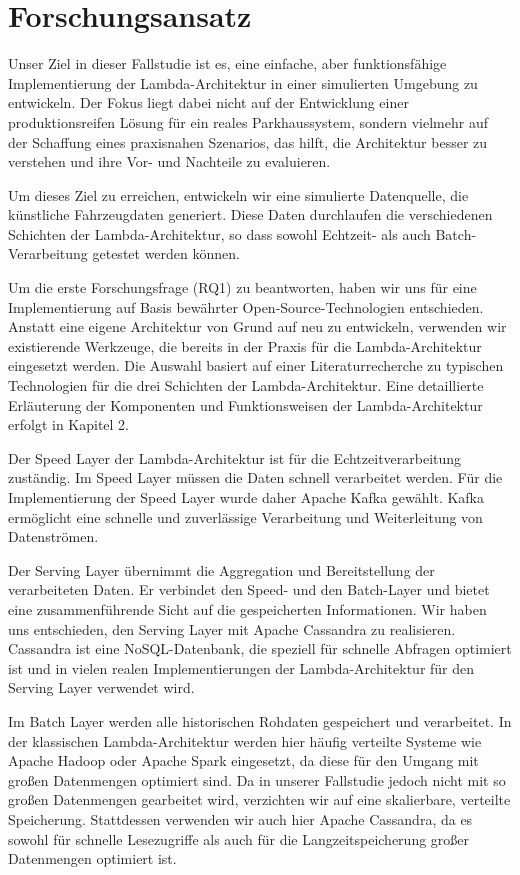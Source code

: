 \section{Forschungsansatz}
Unser Ziel in dieser Fallstudie ist es, eine einfache, aber funktionsfähige Implementierung der Lambda-Architektur in einer simulierten Umgebung zu entwickeln. Der Fokus liegt dabei nicht auf der Entwicklung einer produktionsreifen Lösung für ein reales Parkhaussystem, sondern vielmehr auf der Schaffung eines praxisnahen Szenarios, das hilft, die Architektur besser zu verstehen und ihre Vor- und Nachteile zu evaluieren.

Um dieses Ziel zu erreichen, entwickeln wir eine simulierte Datenquelle, die künstliche Fahrzeugdaten generiert. Diese Daten durchlaufen die verschiedenen Schichten der Lambda-Architektur, so dass sowohl Echtzeit- als auch Batch-Verarbeitung getestet werden können.

Um die erste Forschungsfrage (RQ1) zu beantworten, haben wir uns für eine Implementierung auf Basis bewährter Open-Source-Technologien entschieden. Anstatt eine eigene Architektur von Grund auf neu zu entwickeln, verwenden wir existierende Werkzeuge, die bereits in der Praxis für die Lambda-Architektur eingesetzt werden. Die Auswahl basiert auf einer Literaturrecherche zu typischen Technologien für die drei Schichten der Lambda-Architektur. Eine detaillierte Erläuterung der Komponenten und Funktionsweisen der Lambda-Architektur erfolgt in Kapitel 2.

Der Speed Layer der Lambda-Architektur ist für die Echtzeitverarbeitung zuständig. Im Speed Layer müssen die Daten schnell verarbeitet werden. Für die Implementierung der Speed Layer wurde daher Apache Kafka gewählt. Kafka ermöglicht eine schnelle und zuverlässige Verarbeitung und Weiterleitung von Datenströmen.

Der Serving Layer übernimmt die Aggregation und Bereitstellung der verarbeiteten Daten. Er verbindet den Speed- und den Batch-Layer und bietet eine zusammenführende Sicht auf die gespeicherten Informationen. Wir haben uns entschieden, den Serving Layer mit Apache Cassandra zu realisieren. Cassandra ist eine NoSQL-Datenbank, die speziell für schnelle Abfragen optimiert ist und in vielen realen Implementierungen der Lambda-Architektur für den Serving Layer verwendet wird.

Im Batch Layer werden alle historischen Rohdaten gespeichert und verarbeitet. In der klassischen Lambda-Architektur werden hier häufig verteilte Systeme wie Apache Hadoop oder Apache Spark eingesetzt, da diese für den Umgang mit großen Datenmengen optimiert sind. Da in unserer Fallstudie jedoch nicht mit so großen Datenmengen gearbeitet wird, verzichten wir auf eine skalierbare, verteilte Speicherung. Stattdessen verwenden wir auch hier Apache Cassandra, da es sowohl für schnelle Lesezugriffe als auch für die Langzeitspeicherung großer Datenmengen optimiert ist. 

